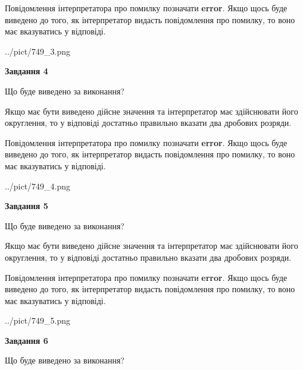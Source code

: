 \documentclass[12pt, ukrainian]{article}
\begin{document}
{\begin {Large}
Повідомлення інтерпретатора про помилку позначати \textbf{error}.
Якщо щось буде виведено до того, як інтерпретатор видасть повідомлення про помилку, 
то воно має вказуватись у відповіді. \par

\begin{center}
	{../pict/749_3.png}
\end{center}
\newpage

{\begin {center}\textbf{Завдання 4}\end {center}}\par
Що буде виведено за виконання? \par

Якщо має бути виведено дійсне значення та інтерпретатор має здійснювати його округлення, 
то у відповіді достатньо правильно вказати два дробових розряди.

Повідомлення інтерпретатора про помилку позначати \textbf{error}.
Якщо щось буде виведено до того, як інтерпретатор видасть повідомлення про помилку, 
то воно має вказуватись у відповіді. \par

\begin{center}
	{../pict/749_4.png}
\end{center}
\newpage

{\begin {center}\textbf{Завдання 5}\end {center}}\par
Що буде виведено за виконання? \par

Якщо має бути виведено дійсне значення та інтерпретатор має здійснювати його округлення, 
то у відповіді достатньо правильно вказати два дробових розряди.

Повідомлення інтерпретатора про помилку позначати \textbf{error}.
Якщо щось буде виведено до того, як інтерпретатор видасть повідомлення про помилку, 
то воно має вказуватись у відповіді. \par

\begin{center}
	{../pict/749_5.png}
\end{center}
\newpage

{\begin {center}\textbf{Завдання 6}\end {center}}\par
Що буде виведено за виконання? \par


\end{Large}}
\end{document}
